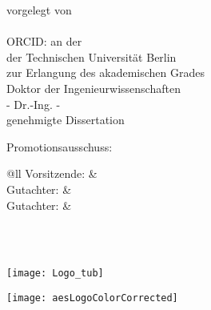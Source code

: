 {{\begin{titlepage}
\begin{center}
				\vfill
				\huge\textbf{\mytitle}
				\vfill
				\Large vorgelegt von\\
				\autor\\
				ORCID: \orcid
				\vfill
				an der \myfaculty \\
				der Technischen Universität Berlin\\
				zur Erlangung des akademischen Grades\\
				\vspace{0.5cm}
				Doktor der Ingenieurwissenschaften\\
				- Dr.-Ing. -\\
				\vspace{0.5cm}
				genehmigte Dissertation
			\end{center}
			\vfill
			\normalsize
			Promotionsausschuss:\\[2ex]
			\begin{tabular}{@{}ll}
			Vorsitzende: & \chairman \\
			Gutachter: & \firstreviewer \\
			Gutachter: & \secondreviewer \\
			\\[3ex]
			\end{tabular}
			\vfill
			\centering
			\myplace\ \the\year		
		\end{titlepage}
		}{
		\begin{titlepage}
			\begin{center}
				\begin{minipage}{0.2\textwidth}
					\centering
					\vfill	
					\texttt{[image: Logo\_tub]}
					\vfill
				\end{minipage}
				\hfill
				\begin{minipage}{0.7\textwidth}
					\centering
					\vfill
					\texttt{[image: aesLogoColorCorrected]}
					\vfill
				\end{minipage}

\end{center}
\end{titlepage}}}
